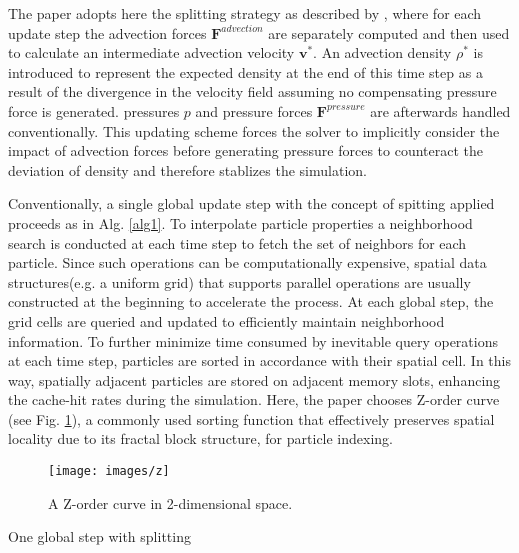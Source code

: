 The paper adopts here the splitting strategy as described by \cite{ihmsen2014sph}, where for each update step the advection forces $ \boldsymbol{F}^{advection} $ are separately computed and then used to calculate an intermediate advection velocity $ \boldsymbol{v}^{*} $. An advection density $ \rho^{*} $ is introduced to represent the expected density at the end of this time step as a result of the divergence in the velocity field assuming no compensating pressure force is generated. pressures $ p $ and pressure forces $ \boldsymbol{F}^{pressure} $ are afterwards handled conventionally. This updating scheme forces the solver to implicitly consider the impact of advection forces before generating pressure forces to counteract the deviation of density and therefore stablizes the simulation.
\par
Conventionally, a single global update step with the concept of spitting applied proceeds as in Alg. \ref{alg1}. To interpolate particle properties a neighborhood search is conducted at each time step to fetch the set of neighbors for each particle. Since such operations can be computationally expensive, spatial data structures(e.g. a uniform grid) that supports parallel operations are usually constructed at the beginning to accelerate the process. At each global step, the grid cells are queried and updated to efficiently maintain neighborhood information. To further minimize time consumed by inevitable query operations at each time step, particles are sorted in accordance with their spatial cell. In this way, spatially adjacent particles are stored on adjacent memory slots, enhancing the cache-hit rates during the simulation. Here, the paper chooses Z-order curve (see Fig. \ref{fig6}), a commonly used sorting function that effectively preserves spatial locality due to its fractal block structure, for particle indexing.

\begin{figure}[tb]
	\centering
	\texttt{[image: images/z]}
	\caption{\label{fig6} A Z-order curve in 2-dimensional space.}
\end{figure}

\large
\begin{algorithm}
	\DontPrintSemicolon
	\SetAlgoLined
	\SetAlCapNameFnt{\large}
	\SetAlCapFnt{\large}
	\caption{\label{alg1} One global step with splitting \cite{reinhardt2017fully}}
\end{algorithm}
\normalsize